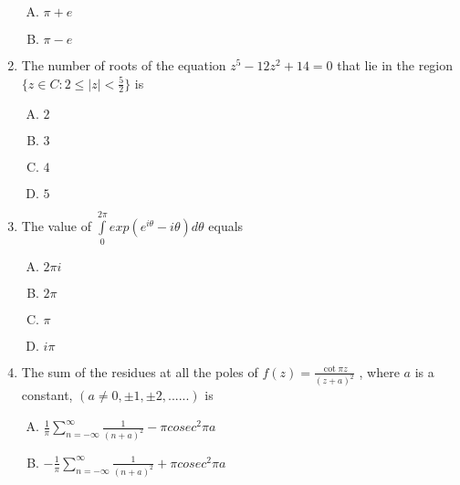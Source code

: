 \documentclass[12pt,a4paper]{article}
\begin{document}
\begin{enumerate}
\begin{enumerate}[(A)]
\item $
\pi + e
$

\item $
\pi - e
$

\end{enumerate}

\item The number of roots of the equation $z^5-12z^2+14=0$ that lie in the region 
$ \lbrace z \in C : 2 \leq \mid z \mid < \frac{5}{2} \rbrace $ is

\begin{enumerate}[(A)]

\item $
2
$

\item $
3
$

\item $
4
$

\item $
5
$

\end{enumerate} 




\item The value of $\int\limits_{0}^{2 \pi} exp ( e^{i \theta} - i \theta) d \theta $ equals


\begin{enumerate}[(A)]

\item $
2 \pi i
$

\item $
2 \pi 
$

\item $
\pi 
$

\item $
i \pi
$

\end{enumerate}

\item The sum of the residues at all the poles of $ f(z) = \frac{\cot \pi z}{(z+a) ^ 2}$ , where $a$ is a constant, $(a \neq 0, \pm 1, \pm 2,......)$ is

\begin{enumerate}[(A)]

\item $
\frac{1}{\pi} \sum\limits_{n= -\infty}^{\infty} \frac{1}{(n+a)^2} - \pi cosec^2 \pi a
$


\item $
-\frac{1}{\pi} \sum\limits_{n= -\infty}^{\infty} \frac{1}{(n+a)^2} + \pi cosec^2 \pi a
$



\end{enumerate}
\end{enumerate}
\end{document}
